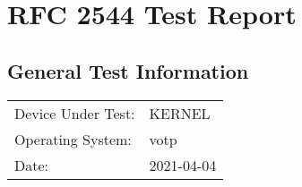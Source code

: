 \documentclass{article}
\begin{document}
\section*{RFC 2544 Test Report}
\subsection{General Test Information}
\begin{tabu} to \textwidth{lX}
Device Under Test: & KERNEL \\
Operating System: & votp \\
Date: & 2021-04-04\\
\end{tabu}
\end{document}
